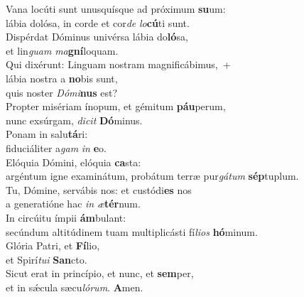 \evenverse Vana locúti sunt unusquísque ad próximum \textbf{su}um:~\*\\
\evenverse lábia dolósa, in corde et cor\textit{de} \textit{lo}\textbf{cú}ti sunt.\\
\oddverse Dispérdat Dóminus univérsa lábia do\textbf{ló}sa,~\*\\
\oddverse et lin\textit{guam} \textit{ma}\textbf{gní}loquam.\\
\evenverse Qui dixérunt: Linguam nostram magnificábimus,~+\\
\evenverse  lábia nostra a \textbf{no}bis sunt,~\*\\
\evenverse quis noster \textit{Dó}\textit{mi}\textbf{nus} est?\\
\oddverse Propter misériam ínopum, et gémitum \textbf{páu}perum,~\*\\
\oddverse nunc exsúrgam, \textit{di}\textit{cit} \textbf{Dó}minus.\\
\evenverse Ponam in salu\textbf{tá}ri:~\*\\
\evenverse fiduciáliter a\textit{gam} \textit{in} \textbf{e}o.\\
\oddverse Elóquia Dómini, elóquia \textbf{ca}sta:~\*\\
\oddverse argéntum igne examinátum, probátum terræ pur\textit{gá}\textit{tum} \textbf{sép}tuplum.\\
\evenverse Tu, Dómine, servábis nos: et custódi\textbf{es} nos~\*\\
\evenverse a generatióne hac \textit{in} \textit{æ}\textbf{tér}num.\\
\oddverse In circúitu ímpii \textbf{ám}bulant:~\*\\
\oddverse secúndum altitúdinem tuam multiplicásti fí\textit{li}\textit{os} \textbf{hó}minum.\\
\evenverse Glória Patri, et \textbf{Fí}lio,~\*\\
\evenverse et Spirí\textit{tu}\textit{i} \textbf{San}cto.\\
\oddverse Sicut erat in princípio, et nunc, et \textbf{sem}per,~\*\\
\oddverse et in sǽcula sæcu\textit{ló}\textit{rum}. \textbf{A}men.\\
